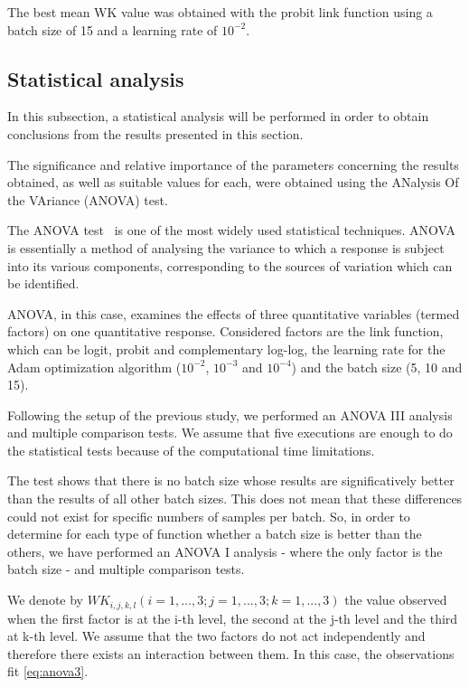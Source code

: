 \documentclass[journal]{IEEEtran}
\begin{document}
	The best mean WK value was obtained with the probit link function using a batch size of 15 and a learning rate of $10^{-2}$.
	
	\subsection{Statistical analysis}
	\label{sect:statisticalanalysis}
	In this subsection, a statistical analysis will be performed in order to obtain conclusions from the results presented in this section.
	
	The significance and relative importance of the parameters concerning the results obtained, as well as suitable values for each, were obtained using the ANalysis Of the VAriance (ANOVA) test.
	
	The ANOVA test~\cite{miller1997beyond} is one of the most widely used statistical techniques. ANOVA is essentially a method of analysing the variance to which a response is subject into its various components, corresponding to the sources of variation which can be identified.
	
	ANOVA, in this case, examines the effects of three quantitative variables (termed factors) on one quantitative response. Considered factors are the link function, which can be logit, probit and complementary log-log, the learning rate for the Adam optimization algorithm ($10^{-2}$, $10^{-3}$ and $10^{-4}$) and the batch size (5, 10 and 15).
	
	Following the setup of the previous study, we performed an ANOVA III analysis and multiple comparison tests. We assume that five executions are enough to do the statistical tests because of the computational time limitations.
	
	The test shows that there is no batch size whose results are significatively better than the results of all other batch sizes. This does not mean that these differences could not exist for specific numbers of samples per batch. So, in order to determine for each type of function whether a batch size is better than the others, we have performed an ANOVA I analysis - where the only factor is the batch size - and multiple comparison tests.
	
	We denote by $WK_{i,j,k,l}(i=1, ..., 3; j = 1, ..., 3; k = 1, ..., 3)$ the value observed when the first factor is at the i-th level, the second at the j-th level and the third at k-th level. We assume that the two factors do not act independently and therefore there exists an interaction between them. In this case, the observations fit \ref{eq:anova3}.
	
\end{document}
